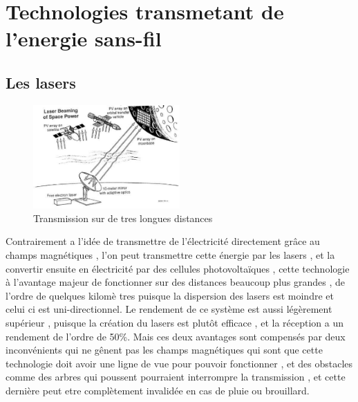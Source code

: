 \documentclass[12pt]{report}
\begin{document}
\section{Technologies transmetant de l'energie sans-fil \cite{wiki5}}
  \subsection{Les lasers}
\begin{figure}
  \begin{center}
    \includegraphics[width=0.5\textwidth]{laser}
  \end{center}
  \caption{Transmission sur de tres longues distances}
\end{figure}Contrairement a l'idée de transmettre de l'électricité directement grâce au champs magnétiques , l'on peut transmettre cette énergie par les lasers  , et la convertir ensuite en électricité par des cellules photovoltaïques , cette technologie à l'avantage majeur de fonctionner sur des distances beaucoup plus grandes , de l'ordre de quelques kilomè tres puisque la dispersion des lasers est moindre et celui ci est uni-directionnel. Le rendement de ce système est aussi légèrement supérieur , puisque la création du lasers est plutôt efficace , et la réception a un rendement de l'ordre de 50\%. Mais ces deux avantages sont compensés par deux inconvénients qui ne gênent pas les champs magnétiques qui sont que cette technologie doit avoir une ligne de vue pour pouvoir fonctionner , et des obstacles comme des arbres qui poussent pourraient interrompre la transmission , et cette dernière peut etre complètement invalidée en cas de pluie ou brouillard.
\end{document}
